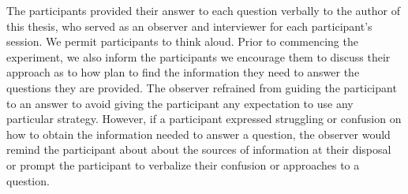 The participants provided their answer to each question verbally to the author of this thesis, 
who served as an observer and interviewer for each participant's session.
We permit participants to think aloud.
Prior to commencing the experiment, we also inform the participants we encourage them to discuss their approach 
as to how plan to find the information they need to answer the questions they are provided.
The observer refrained from guiding the participant to an answer to avoid 
giving the participant any expectation to use any particular strategy.
However, if a participant expressed struggling or confusion on how to obtain the 
information needed to answer a question, the observer would remind the participant about
about the sources of information at their disposal or prompt the participant to verbalize
their confusion or approaches to a question.

